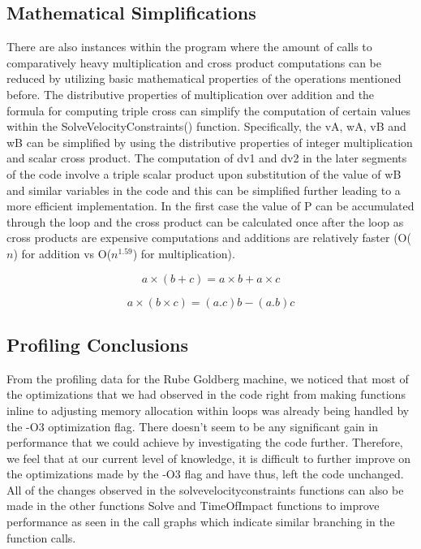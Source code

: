\documentclass[11pt] {article}
\begin{document}
\subsection {Mathematical Simplifications}

There are also instances within the program where the amount of calls to comparatively heavy multiplication
and cross product computations can be reduced by utilizing basic mathematical properties of the operations
mentioned before. The distributive properties of multiplication over addition and the formula for computing
triple cross can simplify the computation of certain values within the SolveVelocityConstraints() function.
Specifically, the vA, wA, vB and wB can be simplified by using the distributive properties of integer
multiplication and scalar cross product. The computation of dv1 and dv2 in the later segments of the code
involve a triple scalar product upon substitution of the value of wB and similar variables in the code and
this can be simplified further leading to a more efficient implementation. In the first case the value of
P can be accumulated through the loop and the cross product can be calculated once after the loop as cross
products are expensive computations and additions are relatively faster (O($n$) for addition vs O($n^{1.59}$)
for multiplication).

\begin {equation} 
a\times(b+c) = a\times b + a \times c
\end {equation}

\begin {equation} 
a\times(b\times c) = (a.c)b - (a.b)c
\end {equation}

\subsection {Profiling Conclusions}

From the profiling data for the Rube Goldberg machine, we noticed that most of the optimizations that we had observed
in the code right from making functions inline to adjusting memory allocation within loops was already being handled by
the -O3 optimization flag. There doesn't seem to be any significant gain in performance that we could achieve by 
investigating the code further. Therefore, we feel that at our current level of knowledge, it is difficult to further
improve on the optimizations made by the -O3 flag and have thus, left the code unchanged. All of the changes observed
in the solvevelocityconstraints functions can also be made in the other functions Solve and TimeOfImpact functions to 
improve performance as seen in the call graphs which indicate similar branching in the function calls.
\end{document}
